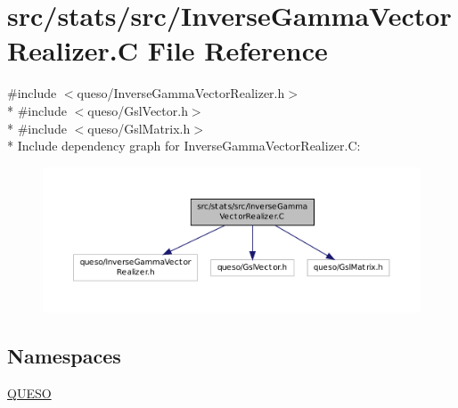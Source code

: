 \hypertarget{_inverse_gamma_vector_realizer_8_c}{\section{src/stats/src/\-Inverse\-Gamma\-Vector\-Realizer.C File Reference}
\label{_inverse_gamma_vector_realizer_8_c}
}
{\ttfamily \#include $<$queso/\-Inverse\-Gamma\-Vector\-Realizer.\-h$>$}\\*
{\ttfamily \#include $<$queso/\-Gsl\-Vector.\-h$>$}\\*
{\ttfamily \#include $<$queso/\-Gsl\-Matrix.\-h$>$}\\*
Include dependency graph for Inverse\-Gamma\-Vector\-Realizer.\-C\-:
\nopagebreak
\begin{figure}[H]
\begin{center}
\leavevmode
\includegraphics[width=350pt]{_inverse_gamma_vector_realizer_8_c__incl}
\end{center}
\end{figure}
\subsection*{Namespaces}
\begin{DoxyCompactItemize}
\item 
\hyperlink{namespace_q_u_e_s_o}{Q\-U\-E\-S\-O}
\end{DoxyCompactItemize}
